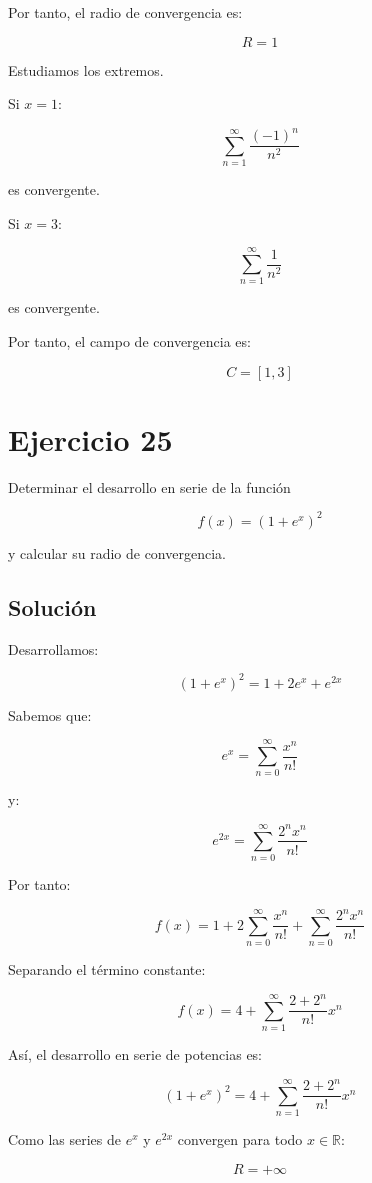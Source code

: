 \documentclass[fleqn]{article}
\begin{document}
	Por tanto, el radio de convergencia es:

	\[
	\boxed{
	R=1
	}
	\]

	Estudiamos los extremos.

	Si $x=1$:

	\[
	\sum_{n=1}^{\infty}
	\frac{(-1)^n}{n^2}
	\]

	es convergente.

	Si $x=3$:

	\[
	\sum_{n=1}^{\infty}
	\frac{1}{n^2}
	\]

	es convergente.

	Por tanto, el campo de convergencia es:

	\[
	\boxed{
	C=[1,3]
	}
	\]

\section{Ejercicio 25}
	Determinar el desarrollo en serie de la función

	\[
	f(x)=(1+e^x)^2
	\]

	y calcular su radio de convergencia.

	\subsection{Solución}

	Desarrollamos:

	\[
	(1+e^x)^2
	=
	1+2e^x+e^{2x}
	\]

	Sabemos que:

	\[
	e^x
	=
	\sum_{n=0}^{\infty}\frac{x^n}{n!}
	\]

	y:

	\[
	e^{2x}
	=
	\sum_{n=0}^{\infty}\frac{2^n x^n}{n!}
	\]

	Por tanto:

	\[
	f(x)
	=
	1
	+
	2\sum_{n=0}^{\infty}\frac{x^n}{n!}
	+
	\sum_{n=0}^{\infty}\frac{2^n x^n}{n!}
	\]

	Separando el término constante:

	\[
	f(x)
	=
	4
	+
	\sum_{n=1}^{\infty}
	\frac{2+2^n}{n!}x^n
	\]

	Así, el desarrollo en serie de potencias es:

	\[
	\boxed{
	(1+e^x)^2
	=
	4+
	\sum_{n=1}^{\infty}
	\frac{2+2^n}{n!}x^n
	}
	\]

	Como las series de $e^x$ y $e^{2x}$ convergen para todo $x\in\mathbb{R}$:

	\[
	\boxed{
	R=+\infty
	}
	\]
\end{document}

